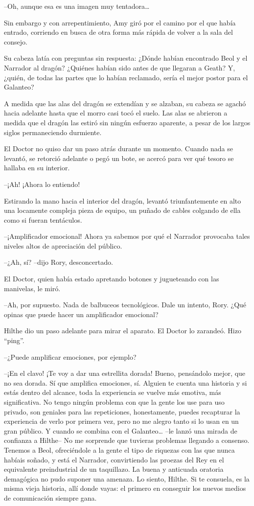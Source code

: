 {--Oh, aunque esa es una imagen muy tentadora\ldots{}}

{Sin embargo y con arrepentimiento, Amy giró por el camino por el que
	había entrado, corriendo en busca de otra forma más rápida de volver a
la sala del consejo.}

{Su cabeza latía con preguntas sin respuesta: ¿Dónde habían encontrado
	Beol y el Narrador al dragón? ¿Quiénes habían sido antes de que llegaran
	a Geath? Y, ¿quién, de todas las partes que lo habían reclamado, sería
el mejor postor para el Galanteo?}

\mbox{}

{A medida que las alas del dragón se extendían y se alzaban, su cabeza
	se agachó hacia adelante hasta que el morro casi tocó el suelo. Las alas
	se abrieron a medida que el dragón las estiró sin ningún esfuerzo
aparente, a pesar de los largos siglos permaneciendo durmiente.}

{El Doctor no quiso dar un paso atrás durante un momento. Cuando nada se
	levantó, se retorció adelante o pegó un bote, se acercó para ver qué
tesoro se hallaba en su interior.}

{--¡Ah! ¡Ahora lo entiendo!}

{Estirando la mano hacia el interior del dragón, levantó triunfantemente
	en alto una locamente compleja pieza de equipo, un puñado de cables
colgando de ella como si fueran tentáculos.}

{--¡Amplificador emocional! Ahora ya sabemos por qué el Narrador
provocaba tales niveles altos de apreciación del público.}

{--¿Ah, sí? --dijo Rory, desconcertado.}

{El Doctor, quien había estado apretando botones y jugueteando con las
manivelas, le miró.}

{--Ah, por supuesto. Nada de balbuceos tecnológicos. Dale un intento,
Rory. ¿Qué opinas que puede hacer un amplificador emocional?}

{Hilthe dio un paso adelante para mirar el aparato. El Doctor lo
zarandeó. Hizo ``ping''.}

{--¿Puede amplificar emociones, por ejemplo?}

{--¡En el clavo! ¡Te voy a dar una estrellita dorada! Bueno,
	pensándolo mejor, que no sea dorada. Sí que amplifica emociones, sí.
	Alguien te cuenta una historia y si estás dentro del alcance, toda la
	experiencia se vuelve más emotiva, más significativa. No tengo ningún
	problema con que la gente los use para uso privado, son geniales para
	las repeticiones, honestamente, puedes recapturar la experiencia de
	verlo por primera vez, pero no me alegro tanto si lo usan en un gran
	público. Y cuando se combina con el Galanteo\ldots{} --le lanzó una
	mirada de confianza a Hilthe-- No me sorprende que tuvieras problemas
	llegando a consenso. Tenemos a Beol, ofreciéndole a la gente el tipo de
	riquezas con las que nunca habíais soñado, y está el Narrador,
	convirtiendo las proezas del Rey en el equivalente preindustrial de un
	taquillazo. La buena y anticuada oratoria demagógica no pudo suponer una
	amenaza. Lo siento, Hilthe. Si te consuela, es la misma vieja historia,
	allí donde vayas: el primero en conseguir los nuevos medios de
comunicación siempre gana.}

